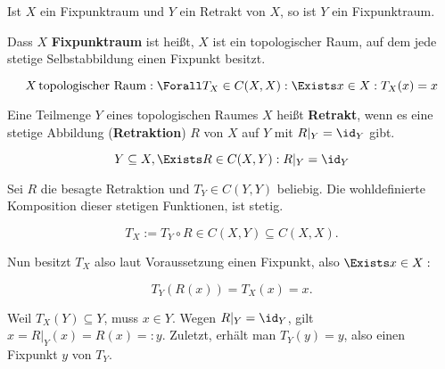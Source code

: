 \begin{exercise}

Ist $X$ ein Fixpunktraum und $Y$ ein Retrakt von $X$, so ist $Y$ ein Fixpunktraum.

\end{exercise}

\begin{solution}

Dass $X$ \textbf{Fixpunktraum} ist heißt, $X$ ist ein topologischer Raum, auf dem jede stetige Selbstabbildung einen Fixpunkt besitzt.

\begin{equation*}
  X \, \text{topologischer Raum}:
  \Forall T_X \in C(X, X):
  \Exists x \in X:
  T_X(x) = x
\end{equation*}

Eine Teilmenge $Y$ eines topologischen Raumes $X$ heißt \textbf{Retrakt}, wenn es eine stetige Abbildung (\textbf{Retraktion}) $R$ von $X$ auf $Y$ mit $R|_Y = \id_Y$ gibt.

\begin{equation*}
  Y \subseteq X,
  \Exists R \in C(X, Y):
  R|_Y = \id_Y
\end{equation*}

Sei $R$ die besagte Retraktion und $T_Y \in C(Y, Y)$ beliebig. Die wohldefinierte Komposition dieser stetigen Funktionen, ist stetig.

\begin{equation*}
  T_X :=
  T_Y \circ R
  \in C(X, Y)
  \subseteq C(X, X).
\end{equation*}

Nun besitzt $T_X$ also laut Voraussetzung einen Fixpunkt, also $\Exists x \in X:$

\begin{equation*}
  T_Y(R(x)) = T_X(x) = x.
\end{equation*}

Weil $T_X(Y) \subseteq Y$, muss $x \in Y$. Wegen $R|_Y = \id_Y$, gilt $x = R|_Y(x) = R(x) =: y$. Zuletzt, erhält man $T_Y(y) = y$, also einen Fixpunkt $y$ von $T_Y$.

\end{solution}
